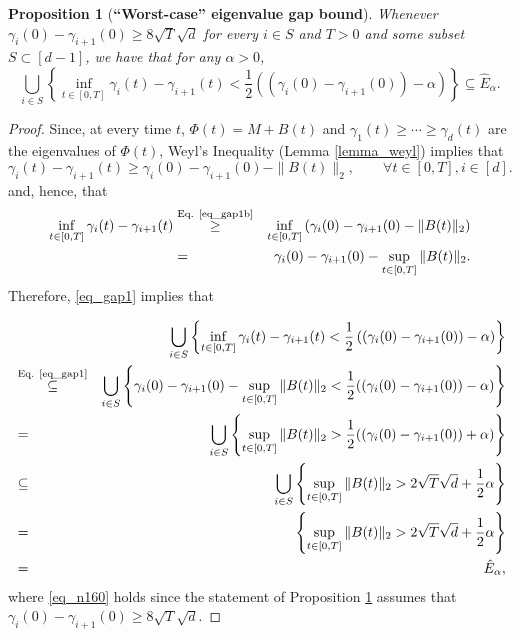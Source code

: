 \documentclass[11pt,letterpaper]{article}
\newtheorem{proposition}[theorem]{Proposition}
\begin{document}
\begin{proposition}[\bf ``Worst-case'' eigenvalue gap bound]\label{lemma_gap_concentration}
Whenever  $\gamma_i(0) - \gamma_{i+1}(0) \geq 8 \sqrt{T} \sqrt{d}$ for every $i \in S$ and $T>0$ and some subset $S \subset [d-1]$, we have that for any $\alpha>0$, 
%
\begin{equation*}
    \bigcup_{i\in S} \left\{\inf_{t \in [0,T]} \gamma_i(t) - \gamma_{i+1}(t) <  \frac{1}{2}\left((\gamma_i(0) - \gamma_{i+1}(0)) - \alpha\right) \right\} \subseteq \hat{E}_\alpha.
    \end{equation*}
%
\end{proposition}
%
\begin{proof}
%
%
Since, at every time $t$, $\Phi(t)= M + B(t)$ and  $\gamma_1(t) \geq \cdots \geq \gamma_d(t)$ are the eigenvalues of $\Phi(t)$, Weyl's Inequality (Lemma \ref{lemma_weyl}) implies that
%
\begin{equation}\label{eq_gap1b}
    \gamma_i(t) - \gamma_{i+1}(t) \geq \gamma_i(0) - \gamma_{i+1}(0) - \|B(t)\|_2, \qquad \forall t\in[0,T], i \in [d].
\end{equation}
 {and, hence, that} 
 \begin{eqnarray} \label{eq_gap1}
   \inf_{t \in [0,T]} \gamma_i(t) - \gamma_{i+1}(t)  &\stackrel{\textrm{Eq. \eqref{eq_gap1b}}}{\geq} & \inf_{t \in [0,T]}\left(\gamma_i(0) - \gamma_{i+1}(0) - \|B(t)\|_2\right) \nonumber\\
   & = &  \gamma_i(0) - \gamma_{i+1}(0) -  \sup_{t \in [0,T]} \|B(t)\|_2.
\end{eqnarray}
%
Therefore, \eqref{eq_gap1} implies that 
%

    \begin{eqnarray}
& & \!\!\!\!\!\!\!\!\!\!\!\!\!\! \!\!\! \!\!\!\!\!\!\!\!\!\!\!\!\!\!\!\!\!\!  \!\!\! \!\!\!\!\!\!\!\!\!\!\!\!\!\!\!\!\!\!  \bigcup_{i\in S} \left\{\inf_{t \in [0,T]} \gamma_i(t) - \gamma_{i+1}(t) <  \frac{1}{2}\left((\gamma_i(0) - \gamma_{i+1}(0)) - \alpha\right) \right\} \nonumber \\    
            &\stackrel{\textrm{Eq. \eqref{eq_gap1}}}{\subseteq} & \bigcup_{i\in S} \left\{ \gamma_i(0) - \gamma_{i+1}(0) - \sup_{t \in [0,T]} \|B(t)\|_2  <  \frac{1}{2}((\gamma_i(0) - \gamma_{i+1}(0)) - \alpha) \right\}  \nonumber\\
         &=&  \bigcup_{i\in S} \left\{ \sup_{t \in [0,T]} \|B(t)\|_2  >  \frac{1}{2}((\gamma_i(0) - \gamma_{i+1}(0)) + \alpha) \right\} \nonumber\\
                  &\subseteq &  \bigcup_{i\in S} \left\{ \sup_{t \in [0,T]} \|B(t)\|_2  >   2\sqrt{T} \sqrt{d} + \frac{1}{2} \alpha \right\} \label{eq_n160}\\
                  &=& \left\{\sup_{t \in [0,T]} \|B(t)\|_2  >   2\sqrt{T} \sqrt{d} + \frac{1}{2} \alpha \right\}\nonumber\\ 
                  & =& \hat{E}_\alpha, \nonumber
    \end{eqnarray}
%
%
where \eqref{eq_n160} holds since the statement of Proposition \ref{lemma_gap_concentration} assumes that $\gamma_i(0) - \gamma_{i+1}(0) \geq 8 \sqrt{T} \sqrt{d}$.
%
\end{proof}
\end{document}
